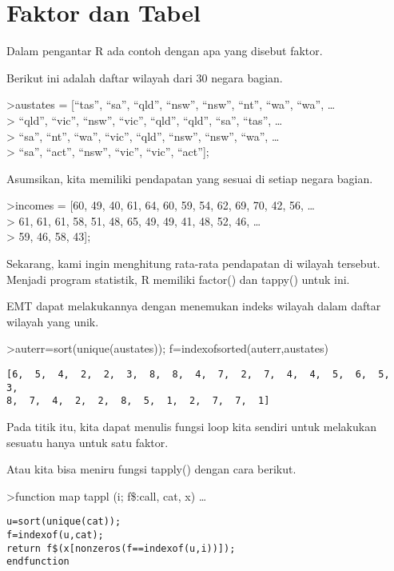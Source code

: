 \documentclass[
]{book}
\begin{document}
\chapter{Faktor dan Tabel}\label{faktor-dan-tabel}

Dalam pengantar R ada contoh dengan apa yang disebut faktor.

Berikut ini adalah daftar wilayah dari 30 negara bagian.

\textgreater austates = {[}``tas'', ``sa'', ``qld'', ``nsw'', ``nsw'', ``nt'', ``wa'', ``wa'', \ldots{}\\
\textgreater{} ``qld'', ``vic'', ``nsw'', ``vic'', ``qld'', ``qld'', ``sa'', ``tas'', \ldots{}\\
\textgreater{} ``sa'', ``nt'', ``wa'', ``vic'', ``qld'', ``nsw'', ``nsw'', ``wa'', \ldots{}\\
\textgreater{} ``sa'', ``act'', ``nsw'', ``vic'', ``vic'', ``act''{]};

Asumsikan, kita memiliki pendapatan yang sesuai di setiap negara bagian.

\textgreater incomes = {[}60, 49, 40, 61, 64, 60, 59, 54, 62, 69, 70, 42, 56, \ldots{}\\
\textgreater{} 61, 61, 61, 58, 51, 48, 65, 49, 49, 41, 48, 52, 46, \ldots{}\\
\textgreater{} 59, 46, 58, 43{]};

Sekarang, kami ingin menghitung rata-rata pendapatan di wilayah tersebut. Menjadi program statistik, R memiliki factor() dan tappy() untuk ini.

EMT dapat melakukannya dengan menemukan indeks wilayah dalam daftar wilayah yang unik.

\textgreater auterr=sort(unique(austates)); f=indexofsorted(auterr,austates)

\begin{verbatim}
[6,  5,  4,  2,  2,  3,  8,  8,  4,  7,  2,  7,  4,  4,  5,  6,  5,  3,
8,  7,  4,  2,  2,  8,  5,  1,  2,  7,  7,  1]
\end{verbatim}

Pada titik itu, kita dapat menulis fungsi loop kita sendiri untuk melakukan sesuatu hanya untuk satu faktor.

Atau kita bisa meniru fungsi tapply() dengan cara berikut.

\textgreater function map tappl (i; f\$:call, cat, x) \ldots{}

\begin{verbatim}
u=sort(unique(cat));
f=indexof(u,cat);
return f$(x[nonzeros(f==indexof(u,i))]);
endfunction
\end{verbatim}
\end{document}
